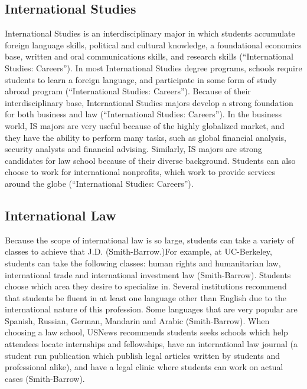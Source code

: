 \begin{multicols}{2}
    \subsection{International Studies}
        International Studies is an interdisciplinary major in which students accumulate foreign language skills, political and cultural knowledge, a foundational economics base, written and oral communications skills, and research skills (“International Studies: Careers”). In most International Studies degree programs, schools require students to learn a foreign language, and participate in some form of study abroad program (“International Studies: Careers”). Because of their interdisciplinary base, International Studies majors develop a strong foundation for both business and law (“International Studies: Careers”). In the business world, IS majors are very useful because of the highly globalized market, and they have the ability to perform many tasks, such as global financial analysis, security analysts and financial advising. Similarly, IS majors are strong candidates for law school because of their diverse background. Students can also choose to work for international nonprofits, which work to provide services around the globe (“International Studies: Careers”). 
    \subsection{International Law}
        Because the scope of international law is so large, students can take a variety of classes to achieve that J.D. (Smith-Barrow.)For example, at UC-Berkeley, students can take the following classes: human rights and humanitarian law, international trade and international investment law (Smith-Barrow). Students choose which area they desire to specialize in. Several institutions recommend that students be fluent in at least one language other than English due to the international nature of this profession. Some languages that are very popular are Spanish, Russian, German, Mandarin and Arabic (Smith-Barrow). When choosing a law school, USNews recommends students seeks schools which help attendees locate internships and fellowships, have an international law journal (a student run publication which publish legal articles written by students and professional alike), and have a legal clinic where students can work on actual cases (Smith-Barrow). 


\end{multicols}
